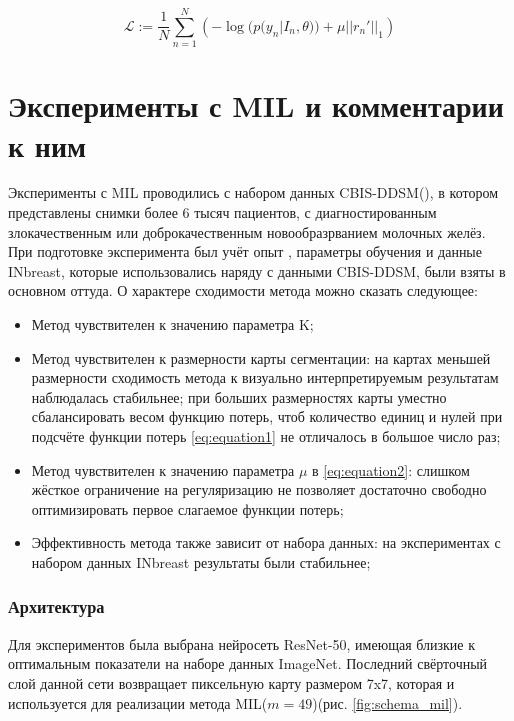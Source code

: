 \begin{equation}
  \label{eq:equation2}
  \mathcal{L} := \frac{1}{N}\sum_{n=1}^N\left(-\log(p(y_n|I_n,\theta)) + \mu||r_n'||_1\right)
\end{equation}


\section{Эксперименты с MIL и комментарии к ним}


Эксперименты с MIL проводились с набором данных CBIS-DDSM(\cite{lee_curated_2017}), в котором представлены снимки более 6 тысяч пациентов, с диагностированным  злокачественным или доброкачественным новообразрванием молочных желёз. При подготовке эксперимента был учёт опыт \cite{zhu_deep_2016}, параметры обучения и данные INbreast, которые использовались наряду с данными CBIS-DDSM, были взяты в основном оттуда. О характере сходимости метода можно сказать следующее:

\begin{itemize}
    \item Метод чувствителен к значению параметра K;
    \item Метод чувствителен к размерности карты сегментации: на картах меньшей размерности сходимость метода к визуально интерпретируемым результатам наблюдалась стабильнее; при больших размерностях карты уместно сбалансировать весом  функцию потерь, чтоб количество единиц и нулей при подсчёте функции потерь \ref{eq:equation1} не отличалось в большое число раз;
    \item Метод чувствителен к значению параметра $\mu$ в \ref{eq:equation2}: слишком жёсткое ограничение на регуляризацию не позволяет достаточно свободно оптимизировать  первое слагаемое функции потерь;
    \item Эффективность метода также зависит от набора данных: на экспериментах с набором данных INbreast результаты были стабильнее;
\end{itemize}




\subsubsection{Архитектура}

Для экспериментов была выбрана нейросеть ResNet-50, имеющая близкие к оптимальным показатели на наборе данных ImageNet. Последний свёрточный слой данной сети возвращает пиксельную карту размером 7x7, которая и используется для реализации метода MIL($m = 49$)(рис. \ref{fig:schema_mil}). 


